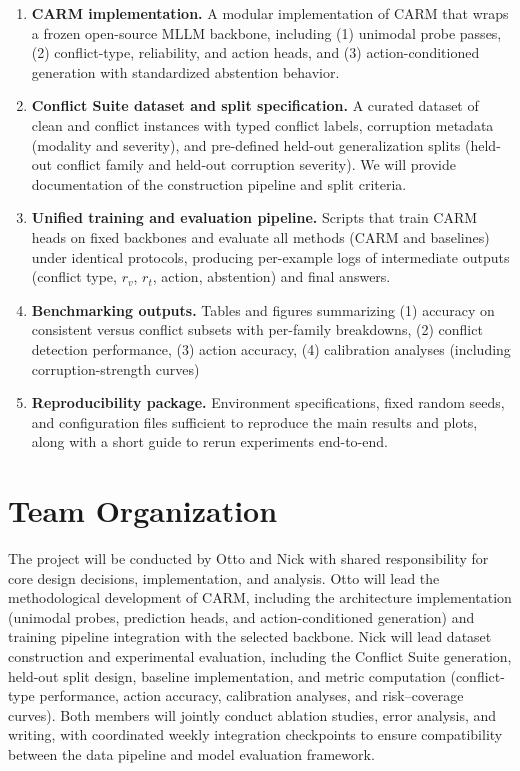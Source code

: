 \documentclass{article}
\begin{document}
\begin{enumerate}
  \item \textbf{CARM implementation.} A modular implementation of CARM that wraps a frozen open-source MLLM backbone, including (1) unimodal probe passes, (2) conflict-type, reliability, and action heads, and (3) action-conditioned generation with standardized abstention behavior.

  \item \textbf{Conflict Suite dataset and split specification.} A curated dataset of clean and conflict instances with typed conflict labels, corruption metadata (modality and severity), and pre-defined held-out generalization splits (held-out conflict family and held-out corruption severity). We will provide documentation of the construction pipeline and split criteria.

  \item \textbf{Unified training and evaluation pipeline.} Scripts that train CARM heads on fixed backbones and evaluate all methods (CARM and baselines) under identical protocols, producing per-example logs of intermediate outputs (conflict type, $r_v$, $r_t$, action, abstention) and final answers.

  \item \textbf{Benchmarking outputs.} Tables and figures summarizing (1) accuracy on consistent versus conflict subsets with per-family breakdowns, (2) conflict detection performance, (3) action accuracy, (4) calibration analyses (including corruption-strength curves)

  \item \textbf{Reproducibility package.} Environment specifications, fixed random seeds, and configuration files sufficient to reproduce the main results and plots, along with a short guide to rerun experiments end-to-end.
\end{enumerate}



\section{Team Organization}
\label{sec:team}

The project will be conducted by Otto and Nick with shared responsibility for core design decisions, implementation, and analysis. Otto will lead the methodological development of CARM, including the architecture implementation (unimodal probes, prediction heads, and action-conditioned generation) and training pipeline integration with the selected backbone. Nick will lead dataset construction and experimental evaluation, including the Conflict Suite generation, held-out split design, baseline implementation, and metric computation (conflict-type performance, action accuracy, calibration analyses, and risk--coverage curves). Both members will jointly conduct ablation studies, error analysis, and writing, with coordinated weekly integration checkpoints to ensure compatibility between the data pipeline and model evaluation framework.
\end{document}
